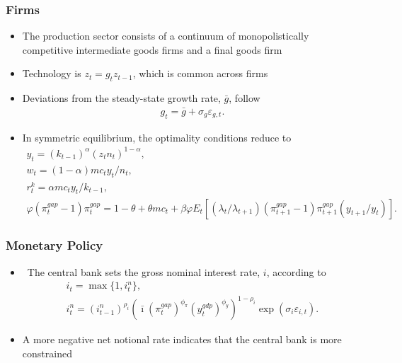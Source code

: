 \documentclass[11pt]{beamer}
\begin{document}
\begin{frame}\frametitle{Firms}
\begin{itemize}\setlength{\itemsep}{8pt}
\item <1-|handout:1>The production sector consists of a continuum of monopolistically competitive intermediate goods firms and a final goods firm 
\item <2-|handout:1>Technology is $z_t = g_tz_{t-1}$, which is common across firms
\item <3-|handout:1>Deviations from the steady-state growth rate, $\bar{g}$, follow
\begin{gather*}
  g_t = \bar{g} + \sigma_g\varepsilon_{g,t}.
\end{gather*}
\item <4-|handout:1>In symmetric equilibrium, the optimality conditions reduce to
\scriptsize
\begin{gather*}
  y_t = (k_{t-1})^\alpha(z_tn_t)^{1-\alpha},\\
  w_t = (1-\alpha)mc_ty_t/n_t,\\
  r_t^k = \alpha mc_t y_t/k_{t-1},\\
  \varphi(\pi_t^{gap}-1)\pi_t^{gap} = 1-\theta + \theta mc_t + \beta\varphi E_t[(\lambda_t/\lambda_{t+1})(\pi_{t+1}^{gap}-1)\pi_{t+1}^{gap}(y_{t+1}/y_t)].
\end{gather*}
\normalfont
\end{itemize}
\end{frame}
\begin{frame}\frametitle{Monetary Policy}
\begin{itemize} \setlength{\itemsep}{14pt}
\item <1-|handout:1>\ 
The central bank sets the gross nominal interest rate, $i$, according to
\begin{gather*}
    i_t=\max\{1,i_t^n\},\\
  i_t^n=(i^n_{t-1})^{\rho_i}(\bar{\imath}(\pi^{gap}_t)^{\phi_\pi}(y^{gdp}_{t})^{\phi_y})^{1-\rho_i}\exp(\sigma_i\varepsilon_{i,t}). 
\end{gather*}
\item <2-|handout:1>A more negative net notional rate indicates that the central bank is more constrained
\end{itemize}
\end{frame}
\end{document}

